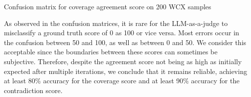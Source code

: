 \begin{table}[!ht]
    \centering
    \begin{minipage}{0.45\textwidth}
        \centering
        
        
        \caption{Confusion matrix for coverage agreement score on 200 WCX samples}
        \label{table: agreement_cm_wcx}
    \end{minipage}
    \hfill
    \begin{minipage}{0.45\textwidth}
        \centering
        
        \caption{Confusion matrix for coverage agreement score on 150 NitiBench-Tax samples}
        \label{table: agreement_cm_tax}
    \end{minipage}
\end{table}

As observed in the confusion matrices, it is rare for the LLM-as-a-judge to misclassify a ground truth score of 0 as 100 or vice versa. 
%
Most errors occur in the confusion between 50 and 100, as well as between 0 and 50. 
%
We consider this acceptable since the boundaries between these scores can sometimes be subjective. 
%
Therefore, despite the agreement score not being as high as initially expected after multiple iterations, we conclude that it remains reliable, achieving at least 80\% accuracy for the coverage score and at least 90\% accuracy for the contradiction score.
